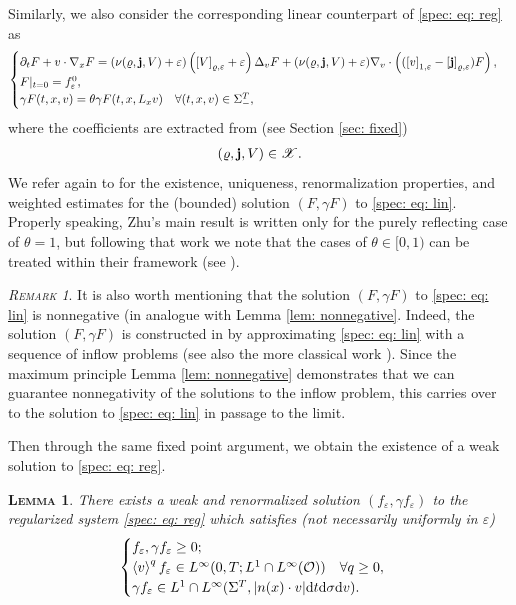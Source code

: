 \documentclass[10pt, reqno]{amsart}
\theoremstyle{plain}
\newtheorem{lemma}[theorem]{\normalfont \scshape Lemma}
\theoremstyle{definition}
\theoremstyle{remark}
\newtheorem{remark}[theorem]{\normalfont \scshape Remark}
\numberwithin{equation}{section}
\newcommand{\bfj}{{\bf j}}
\newcommand{\calO}{\mathcal O}
\newcommand{\scrX}{\mathscr X}
\newcommand{\p}{\partial}
\newcommand{\ve}{\varepsilon}
\newcommand{\dv}{\textnormal{d}v}
\newcommand{\dt}{\textnormal{d}t}
\newcommand{\tnd}{\textnormal{d}}
\newcommand{\lt}{\left}
\newcommand{\rt}{\right}
\newcommand{\renorm}[3]{\lt[#1\rt]_{#2 , #3}}
\begin{document}
Similarly, we also consider the corresponding linear counterpart of \eqref{spec: eq: reg} as
\begin{align} \label{spec: eq: lin}
    \begin{cases}
        \p_t F + v\cdot \nabla_x F = (\nu(\varrho, \bfj, V) + \ve) \lt(\renorm{V}{\varrho}{\ve} + \ve \rt) \Delta_v F + (\nu(\varrho, \bfj, V) + \ve) \nabla_v\cdot \lt( (\renorm{v}{1}{\ve} - \renorm{\bfj}{\varrho}{\ve}) F\rt) ,\\
        F|_{t=0} = f^0_\ve , \\
        \gamma F(t,x,v) = \theta \gamma F(t,x,L_xv) \quad \forall (t,x,v)\in \Sigma_-^T,
    \end{cases}
\end{align}
where the coefficients are extracted from (see Section \ref{sec: fixed})
\begin{align*}
    (\varrho, \bfj, V) \in \scrX.
\end{align*}
We refer again to \cite[Theorem 1.1]{Zhu24} for the existence, uniqueness, renormalization properties, and weighted estimates for the (bounded) solution $(F,\gamma F)$ to \eqref{spec: eq: lin}. Properly speaking, Zhu's main result is written only for the purely reflecting case of $\theta=1$, but following that work we note that the cases of $\theta\in [0,1)$ can be treated within their framework (see \cite[Sections 2, 5]{Zhu24}). 

\begin{remark}
It is also worth mentioning that the solution $(F,\gamma F)$ to \eqref{spec: eq: lin} is nonnegative (in analogue with Lemma \ref{lem: nonnegative}. Indeed, the solution $(F,\gamma F)$ is constructed in \cite[Section 2.2.2]{Zhu24} by approximating \eqref{spec: eq: lin} with a sequence of inflow problems (see also the more classical work \cite[Section 5]{Carrillo98}). Since the maximum principle Lemma \ref{lem: nonnegative} demonstrates that we can guarantee nonnegativity of the solutions to the inflow problem, this carries over to the solution to \eqref{spec: eq: lin} in passage to the limit.
\end{remark}

Then through the same fixed point argument, we obtain the existence of a weak solution to \eqref{spec: eq: reg}.

\begin{lemma}
    There exists a weak and renormalized solution $(f_\ve,\gamma f_\ve)$ to the regularized system \eqref{spec: eq: reg} which satisfies (not necessarily uniformly in $\ve$)
    \begin{align*}
        \begin{cases}
         f_\ve, \gamma f_\ve \ge 0 ; \\
        \lt<v\rt>^q f_\ve \in L^\infty(0,T;L^1 \cap L^\infty(\calO)) \quad \forall q \ge 0, \\
         \gamma f_\ve \in L^1\cap L^\infty(\Sigma^T,|n(x)\cdot v|\dt\tnd\sigma\dv).
            \end{cases}
    \end{align*}
\end{lemma}
\end{document}
